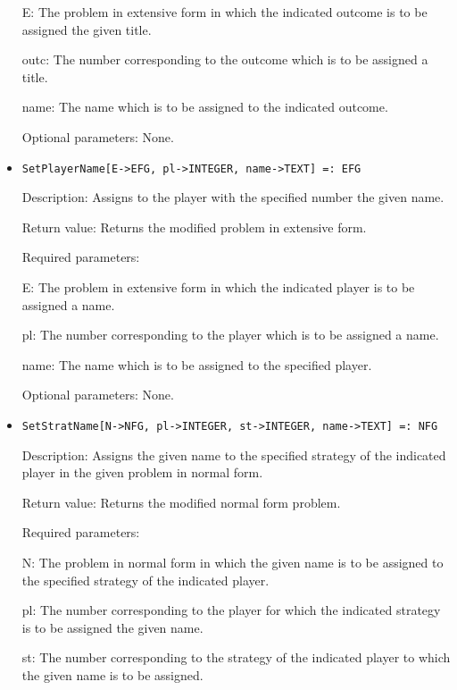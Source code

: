 \begin{itemize}
\bd
\item
[ E:] The problem in extensive form in which the indicated outcome 
is to be assigned the given title.
\item
[ outc:] The number corresponding to the outcome which is to be 
assigned a title.
\item
[ name:] The name which is to be assigned to the indicated outcome.
\ed

\item
[Optional parameters:] None.
\ed

\item

\protect \large \begin{verbatim}
SetPlayerName[E->EFG, pl->INTEGER, name->TEXT] =: EFG
\end{verbatim}\normalsize

\bd
\item
[Description:] Assigns to the player with the specified number the given
name.
\item
[Return value:] Returns the modified problem in extensive form.
\item
[Required parameters:]\hfil\null

\bd
\item
[ E:] The problem in extensive form in which the indicated player is
to be assigned a name.
\item
[ pl:] The number corresponding to the player which is to be 
assigned a name.
\item
[ name:] The name which is to be assigned to the specified player.
\ed
\item
[Optional parameters:] None.
\ed

\item

\protect \large \begin{verbatim}
SetStratName[N->NFG, pl->INTEGER, st->INTEGER, name->TEXT] =: NFG
\end{verbatim}\normalsize

\bd
\item
[Description:] Assigns the given name to the specified strategy of the
indicated player in the given problem in normal form.
\item
[Return value:] Returns the modified normal form problem.
\item
[Required parameters:]\hfil\null
	
\bd
\item
[ N:] The problem in normal form in which the given name is to be
assigned to the specified strategy of the indicated player.
\item
[ pl:] The number corresponding to the player for which the 
indicated strategy is to be assigned the given name.
\item
[ st:] The number corresponding to the strategy of the indicated 
player to which the given name is to be assigned.
\ed


\end{itemize}
